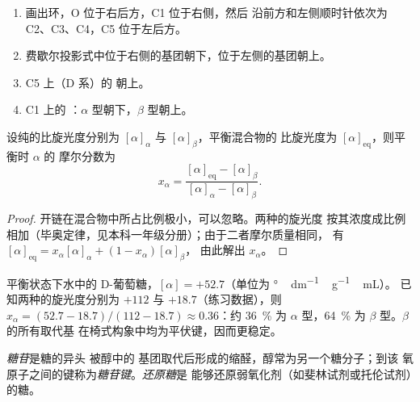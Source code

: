 \begin{method}\label{met:b2:biomolecules:haworth}
\begin{enumerate}
  \item 画出环，O 位于右后方，C1 位于右侧，然后
        沿前方和左侧顺时针依次为 C2、C3、C4，C5 位于左后方。
  \item 费歇尔投影式中位于右侧的基团朝下，位于左侧的基团朝上。
  \item C5 上（D 系）的  朝上。
  \item C1 上的 ：$\alpha$ 型朝下，$\beta$ 型朝上。
\end{enumerate}
\end{method}

\begin{proposition}[变旋平衡]\label{prop:b2:biomolecules:mutarotation}
设纯的比旋光度分别为 $[\alpha]_\alpha$ 与 $[\alpha]_\beta$，平衡混合物的
比旋光度为 $[\alpha]_{\mathrm{eq}}$，则平衡时 $\alpha$ 的
摩尔分数为
\begin{equation*}
x_\alpha = \frac{[\alpha]_{\mathrm{eq}} - [\alpha]_\beta}{[\alpha]_\alpha - [\alpha]_\beta}.
\end{equation*}
\end{proposition}

\begin{proof}
开链在混合物中所占比例极小，可以忽略。两种的旋光度
按其浓度成比例相加（毕奥定律，见本科一年级分册）；由于二者摩尔质量相同，
有 $[\alpha]_{\mathrm{eq}} = x_\alpha[\alpha]_\alpha + (1 - x_\alpha)[\alpha]_\beta$，
由此解出 $x_\alpha$。
\end{proof}

平衡状态下水中的 D-葡萄糖，$[\alpha] = +52.7$（单位为 \unit{\degree\,dm^{-1}\,g^{-1}\,mL}）。
已知两种的旋光度分别为 $+112$ 与 $+18.7$（练习数据），则 $x_\alpha = (52.7 - 18.7)/(112 - 18.7)
\approx 0.36$：约 36~\% 为 $\alpha$ 型，64~\% 为 $\beta$ 型。$\beta$ 的所有取代基
在椅式构象中均为平伏键，因而更稳定。

\begin{definition}[糖苷]\label{def:b2:biomolecules:glycoside}
\emph{糖苷}是糖的异头 
被醇中的  基团取代后形成的缩醛，醇常为另一个糖分子；到该
氧原子之间的键称为\emph{糖苷键}。\emph{还原糖}是
能够还原弱氧化剂（如斐林试剂或托伦试剂）的糖。
\end{definition}

